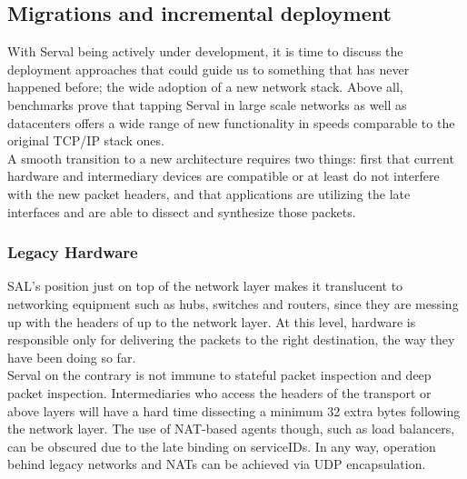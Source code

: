 \subsection{Migrations and incremental deployment}
With Serval being actively under development, it is time to discuss the deployment approaches that could guide us to something that has never happened before; the wide adoption of a new network stack.
Above all, benchmarks prove that tapping Serval in large scale networks as well as datacenters offers a wide range of new functionality in speeds comparable to the original TCP/IP stack ones.\\
\indent A smooth transition to a new architecture requires two things: first that current hardware and intermediary devices are compatible or at least do not interfere with the new packet headers, and that applications are utilizing the late interfaces and are able to dissect and synthesize those packets.

\subsubsection{Legacy Hardware}
SAL's position just on top of the network layer makes it translucent to networking equipment such as hubs, switches and routers, since they are messing up with the headers of up to the network layer.
At this level, hardware is responsible only for delivering the packets to the right destination, the way they have been doing so far.\\
\indent Serval on the contrary is not immune to stateful packet inspection and deep packet inspection.
Intermediaries who access the headers of the transport or above layers will have a hard time dissecting a minimum 32 extra bytes following the network layer.
The use of NAT-based agents though, such as load balancers, can be obscured due to the late binding on serviceIDs.
In any way, operation behind legacy networks and NATs can be achieved via UDP encapsulation.

